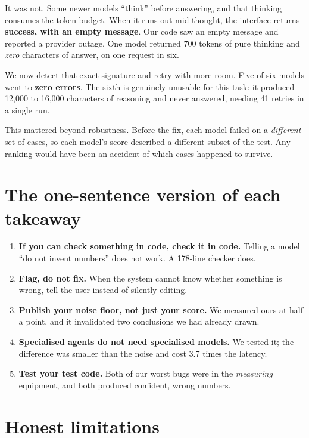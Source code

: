 \documentclass[11pt]{article}
\begin{document}
It was not. Some newer models ``think'' before answering, and that thinking
consumes the token budget. When it runs out mid-thought, the interface returns
\textbf{success, with an empty message}. Our code saw an empty message and
reported a provider outage. One model returned 700 tokens of pure thinking and
\emph{zero} characters of answer, on one request in six.

We now detect that exact signature and retry with more room. Five of six models
went to \textbf{zero errors}. The sixth is genuinely unusable for this task: it
produced 12{,}000 to 16{,}000 characters of reasoning and never answered,
needing 41 retries in a single run.

This mattered beyond robustness. Before the fix, each model failed on a
\emph{different} set of cases, so each model's score described a different
subset of the test. Any ranking would have been an accident of which cases
happened to survive.

\section{The one-sentence version of each takeaway}

\begin{enumerate}
\item \textbf{If you can check something in code, check it in code.} Telling a
      model ``do not invent numbers'' does not work. A 178-line checker does.
\item \textbf{Flag, do not fix.} When the system cannot know whether something
      is wrong, tell the user instead of silently editing.
\item \textbf{Publish your noise floor, not just your score.} We measured ours
      at half a point, and it invalidated two conclusions we had already drawn.
\item \textbf{Specialised agents do not need specialised models.} We tested it;
      the difference was smaller than the noise and cost 3.7 times the latency.
\item \textbf{Test your test code.} Both of our worst bugs were in the
      \emph{measuring} equipment, and both produced confident, wrong numbers.
\end{enumerate}

\section{Honest limitations}
\end{document}
